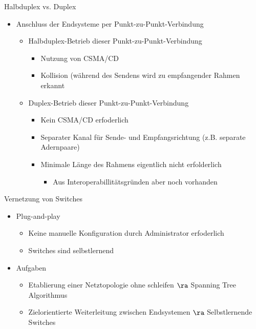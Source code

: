       Halbduplex vs. Duplex
      \begin{itemize}
        \item Anschluss der Endsysteme per Punkt-zu-Punkt-Verbindung
          \begin{itemize}
            \item Halbduplex-Betrieb dieser Punkt-zu-Punkt-Verbindung
              \begin{itemize}
                \item Nutzung von CSMA/CD
                \item Kollision (während des Sendens wird zu empfangender Rahmen erkannt
              \end{itemize}
            \item Duplex-Betrieb dieser Punkt-zu-Punkt-Verbindung
              \begin{itemize}
                \item Kein CSMA/CD erfoderlich
                \item Separater Kanal für Sende- und Empfangsrichtung (z.B. separate Adernpaare)
                \item Minimale Länge des Rahmens eigentlich nicht erfolderlich
                  \begin{itemize}
                    \item Aus Interoperabillitätsgründen aber noch vorhanden
                  \end{itemize}
              \end{itemize}
          \end{itemize}
      \end{itemize}
      Vernetzung von Switches
      \begin{itemize}
        \item Plug-and-play
          \begin{itemize}
            \item Keine manuelle Konfiguration durch Administrator erfoderlich
            \item Switches sind selbstlernend
          \end{itemize}
        \item Aufgaben
          \begin{itemize}
            \item Etablierung einer Netztopologie ohne schleifen $\ra$ Spanning Tree Algorithmus
            \item Zielorientierte Weiterleitung zwischen Endsystemen $\ra$ Selbstlernende Switches
          \end{itemize}
      \end{itemize}

